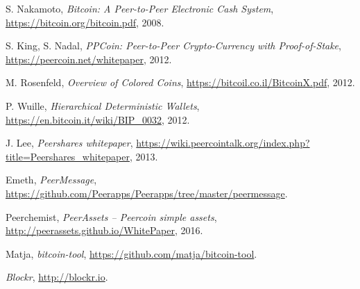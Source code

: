 \documentclass[a4paper,10pt]{article}
\begin{document}
\begin{thebibliography}{9}

  S. Nakamoto,
  \emph{Bitcoin: A Peer-to-Peer Electronic Cash System},
  \url{https://bitcoin.org/bitcoin.pdf},
  2008.

  S. King, S. Nadal,
  \emph{PPCoin: Peer-to-Peer Crypto-Currency with Proof-of-Stake},
  \url{https://peercoin.net/whitepaper},
  2012.

  M. Rosenfeld,
  \emph{Overview of Colored Coins},
  \url{https://bitcoil.co.il/BitcoinX.pdf},
  2012.

  P. Wuille,
  \emph{Hierarchical Deterministic Wallets},
  \url{https://en.bitcoin.it/wiki/BIP_0032},
  2012.

  J. Lee,
  \emph{Peershares whitepaper},
  \url{https://wiki.peercointalk.org/index.php?title=Peershares_whitepaper},
  2013.

  Emeth,
  \emph{PeerMessage},
  \url{https://github.com/Peerapps/Peerapps/tree/master/peermessage}.

  Peerchemist,
  \emph{PeerAssets – Peercoin simple assets},
  \url{http://peerassets.github.io/WhitePaper},
  2016.

  Matja,
  \emph{bitcoin-tool},
  \url{https://github.com/matja/bitcoin-tool}.

  \emph{Blockr},
  \url{http://blockr.io}.

\end{thebibliography}
\end{document}
